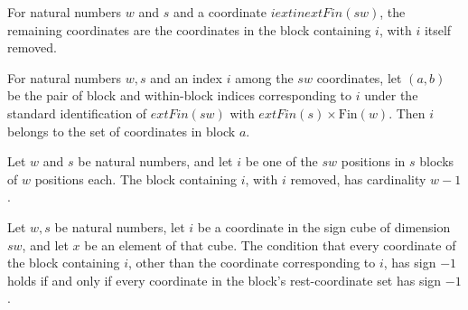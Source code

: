\begin{definition}
\label{FABL.tribesRestCoordinates}
\leanok
{}
For natural numbers $w$ and $s$ and a coordinate $i 	ext{ in } 	ext{Fin}(sw)$, the
remaining coordinates are the coordinates in the block containing $i$, with $i$ itself
removed.
\end{definition}

\begin{theorem}
\label{FABL.mem_tribesBlockCoordinates_self}
\leanok
{}
For natural numbers $w,s$ and an index $i$ among the $sw$ coordinates, let $(a,b)$ be
the pair of block and within-block indices corresponding to $i$ under the standard
identification of $	ext{Fin}(sw)$ with $	ext{Fin}(s)\times\text{Fin}(w)$. Then $i$
belongs to the set of coordinates in block $a$.
\end{theorem}

\begin{theorem}
\label{FABL.card_tribesRestCoordinates}
\leanok
{}
Let $w$ and $s$ be natural numbers, and let $i$ be one of the $sw$ positions in $s$
blocks of $w$ positions each. The block containing $i$, with $i$ removed, has
cardinality $w-1$.
\end{theorem}

\begin{theorem}
\label{FABL.tribesRestTrue_iff_all_neg_on_restCoordinates}
\leanok
{}
Let $w,s$ be natural numbers, let $i$ be a coordinate in the sign cube of dimension
$sw$, and let $x$ be an element of that cube. The condition that every coordinate of the
block containing $i$, other than the coordinate corresponding to $i$, has sign $-1$
holds if and only if every coordinate in the block's rest-coordinate set has sign $-1$.
\end{theorem}

